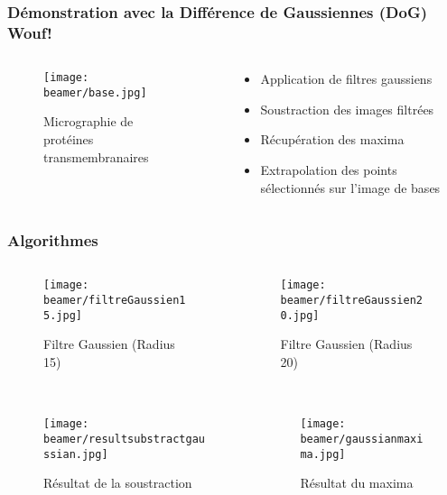 \documentclass[11pt]{beamer}
\begin{document}
\begin{frame}
\frametitle{Démonstration avec la Différence de Gaussiennes (DoG)$~$ Wouf!}
	\begin{columns}
		\begin{column}{5cm}
			\begin{figure}
				\texttt{[image: beamer/base.jpg]}
	
				Micrographie de protéines transmembranaires
			\end{figure}
		\end{column}
		\begin{column}{5cm}
			\begin{itemize}
				\item Application de filtres gaussiens
				\item Soustraction des images filtrées
				\item Récupération des maxima
				\item Extrapolation des points sélectionnés sur l'image de bases
			\end{itemize}
		\end{column}
	\end{columns}
\end{frame}
\begin{frame}
\frametitle{Algorithmes}
	\begin{columns}
		\begin{column}{5cm}
			\begin{figure}
				\texttt{[image: beamer/filtreGaussien15.jpg]}
				
				Filtre Gaussien (Radius 15)
			\end{figure}			
		\end{column}
		\begin{column}{5cm}
			\begin{figure}
				\texttt{[image: beamer/filtreGaussien20.jpg]}
				
				Filtre Gaussien (Radius 20)
			\end{figure}
		\end{column}
	\end{columns}
\end{frame}
\begin{frame}
\frametitle{}
\begin{columns}
\begin{column}{5cm}
			\begin{figure}
				\texttt{[image: beamer/resultsubstractgaussian.jpg]}
				
				Résultat de la soustraction
			\end{figure}
\end{column}
\begin{column}{5cm}
			\begin{figure}
				\texttt{[image: beamer/gaussianmaxima.jpg]}
				
				Résultat du maxima
			\end{figure}
\end{column}
\end{columns}
\end{frame}
\end{document}
